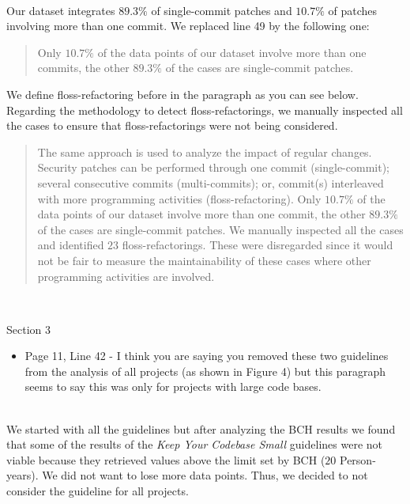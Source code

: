 \documentclass[11pt,fleqn]{article}
\newcommand{\eline}{\vspace*{.75\baselineskip}}
\newcommand{\Referee}[1]{\eline \noindent {\bf Reviewer comment #1:} \\}
\newcommand{\Us}{\eline \noindent {\bf Response:}\\}
\newenvironment{revcomment}[1][]
{\Referee{#1}\begin{rcomment}}
{\end{rcomment}}
\begin{document}
\Us Our dataset integrates $89.3\%$ of single-commit patches and 
$10.7\%$ of patches involving more than one commit. We replaced 
line 49 by the following one:

\begin{quote}
    Only $10.7\%$ of the data points 
of our dataset involve more than one commits, the other
$89.3\%$ of the cases are single-commit patches.
\end{quote}

We define floss-refactoring before in the paragraph
as you can see below. Regarding the methodology to detect floss-refactorings, 
we manually inspected all the cases to ensure that 
floss-refactorings were not being considered. 

\begin{quote}
    The same approach is used to analyze the impact of regular 
    changes. Security patches can be performed through one commit (single-commit); 
    several consecutive commits (multi-commits); or, commit(s) interleaved with more 
    programming activities (floss-refactoring). Only $10.7\%$ of the data points 
    of our dataset involve more than one commit, the other
    $89.3\%$ of the cases are single-commit patches. We manually 
    inspected all the cases and identified $23$ floss-refactorings. 
    These were disregarded since it would not be fair to measure the 
    maintainability of these cases where other programming activities 
    are involved.
\end{quote}


\begin{revcomment}[2.14]
    Section 3\\
    \begin{itemize}
        \item Page 11, Line 42 - I think you are saying you removed these two guidelines 
        from the analysis of all projects (as shown in Figure 4) but this paragraph seems 
        to say this was only for projects with large code bases.
    \end{itemize}
\end{revcomment}

\Us We started with all the guidelines but after analyzing the BCH results 
we found that some of the results of the \emph{Keep Your Codebase Small} guidelines were not viable
because they retrieved values above the limit set by BCH ($20$ Person-years). We did not want 
to lose more data points. Thus, we decided to not consider the guideline for all projects.
\end{document}
